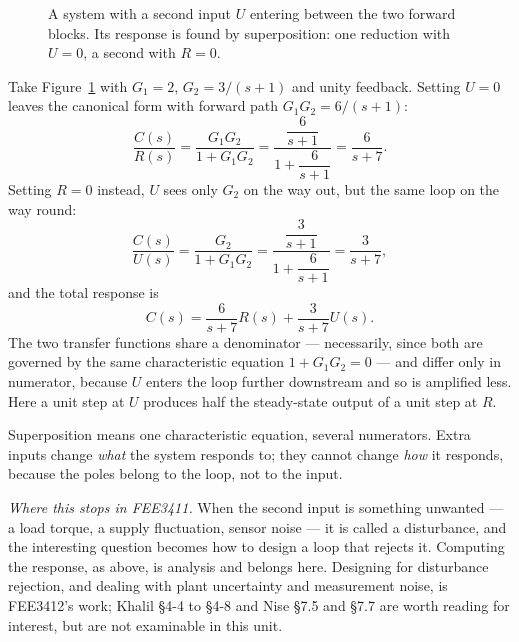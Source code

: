 \documentclass[11pt,a4paper]{article}
\renewcommand{\sumsign}[3]{\node[font=\scriptsize] at ($(#1)+(#2:0.72)$) {$#3$};}
\begin{document}
\begin{figure}[htbp]
\centering
{}
\caption{A system with a second input $U$ entering between the two forward
blocks. Its response is found by superposition: one reduction with $U=0$, a
second with $R=0$.}
\label{fig:twoinput}
\end{figure}

Take Figure~\ref{fig:twoinput} with $G_1=2$, $G_2=3/(s+1)$ and unity feedback.
Setting $U=0$ leaves the canonical form with forward path $G_1G_2=6/(s+1)$:
\[
  \frac{C(s)}{R(s)} = \frac{G_1G_2}{1+G_1G_2}
   = \frac{\dfrac{6}{s+1}}{1+\dfrac{6}{s+1}}
   = \frac{6}{s+7} .
\]
Setting $R=0$ instead, $U$ sees only $G_2$ on the way out, but the same loop on
the way round:
\[
  \frac{C(s)}{U(s)} = \frac{G_2}{1+G_1G_2}
   = \frac{\dfrac{3}{s+1}}{1+\dfrac{6}{s+1}}
   = \frac{3}{s+7} ,
\]
and the total response is
\[
  C(s) = \frac{6}{s+7}R(s) + \frac{3}{s+7}U(s) .
\]
The two transfer functions share a denominator --- necessarily, since both are
governed by the same characteristic equation $1+G_1G_2=0$ --- and differ only
in numerator, because $U$ enters the loop further downstream and so is
amplified less. Here a unit step at $U$ produces half the steady-state output
of a unit step at $R$.

\begin{keyidea}
Superposition means one characteristic equation, several numerators. Extra
inputs change \emph{what} the system responds to; they cannot change
\emph{how} it responds, because the poles belong to the loop, not to the input.
\end{keyidea}

\noindent
\emph{Where this stops in FEE3411.} When the second input is something
unwanted --- a load torque, a supply fluctuation, sensor noise --- it is called
a disturbance, and the interesting question becomes how to design a loop that
rejects it. Computing the response, as above, is analysis and belongs here.
Designing for disturbance rejection, and dealing with plant uncertainty and
measurement noise, is FEE3412's work; Khalil \S4-4 to \S4-8 and Nise \S7.5 and
\S7.7 are worth reading for interest, but are not examinable in this unit.
\end{document}
